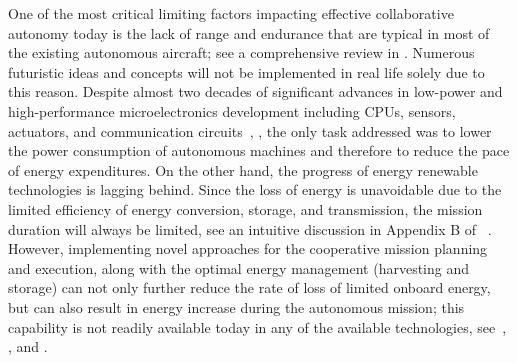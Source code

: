 \documentclass{ifacconf}
\newcommand{\squeezeup}{\vspace{-2.0mm}}
\begin{document}
\squeezeup

One of the most critical limiting factors impacting effective collaborative autonomy
today is the lack of range and endurance that are typical in most of the existing
autonomous aircraft; see a comprehensive review in \cite{NAC:2005}. Numerous futuristic
ideas and concepts will not be implemented in real life solely due to this reason.
Despite almost two decades of significant advances in low-power and high-performance
microelectronics development including CPUs, sensors, actuators, and communication
circuits~\cite{Tong:1995}, \cite{Singh:2010}, the only task addressed was to lower the
power consumption of autonomous machines and therefore to reduce the pace of energy
expenditures. On the other hand, the progress of energy renewable technologies is lagging
behind. Since the loss of energy is unavoidable due to the limited efficiency of energy
conversion, storage, and transmission, the mission duration will always be limited, see
an intuitive discussion in Appendix B of ~\cite{NAC:2005}. However, implementing novel
approaches for the cooperative mission planning and execution, along with the optimal
energy management (harvesting and storage) can not only further reduce the rate of loss
of limited onboard energy, but can also result in energy increase during the autonomous
mission; this capability is not readily available today in any of the available
technologies, see~\cite{Siciliano:2008}, \cite{Martinez:2008}, and \cite{Nonami:2013}.

\end{document}

